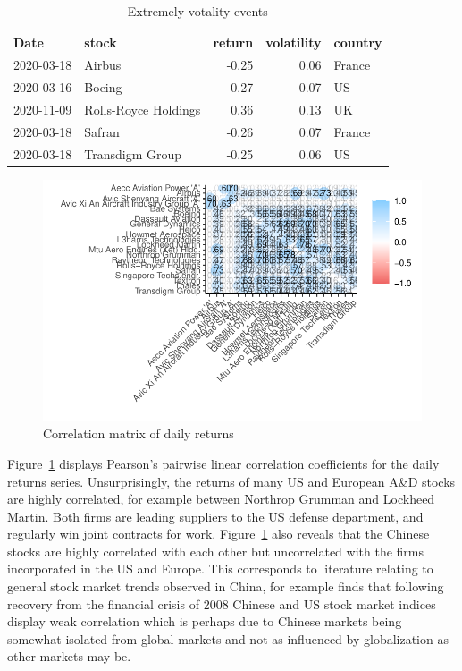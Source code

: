 \documentclass[
  number]{elsarticle}
\begin{document}
\hypertarget{tbl-Xtremes}{}
\begin{table}[H]
\caption{\label{tbl-Xtremes}Extremely votality events }\tabularnewline

\centering
\begin{tabular}[t]{llrrl}
\toprule
Date & stock & return & volatility & country\\
\midrule
2020-03-18 & Airbus & -0.25 & 0.06 & France\\
2020-03-16 & Boeing & -0.27 & 0.07 & US\\
2020-11-09 & Rolls-Royce Holdings & 0.36 & 0.13 & UK\\
2020-03-18 & Safran & -0.26 & 0.07 & France\\
2020-03-18 & Transdigm Group & -0.25 & 0.06 & US\\
\bottomrule
\end{tabular}
\end{table}

\begin{figure}[H]

{\centering \includegraphics{defence_files/figure-pdf/fig-cor-1.pdf}

}

\caption{\label{fig-cor}Correlation matrix of daily returns}

\end{figure}

Figure~\ref{fig-cor} displays Pearson's pairwise linear correlation
coefficients for the daily returns series. Unsurprisingly, the returns
of many US and European A\&D stocks are highly correlated, for example
between Northrop Grumman and Lockheed Martin. Both firms are leading
suppliers to the US defense department, and regularly win joint
contracts for work. Figure~\ref{fig-cor} also reveals that the Chinese
stocks are highly correlated with each other but uncorrelated with the
firms incorporated in the US and Europe. This corresponds to literature
relating to general stock market trends observed in China, for example
\citep{valukonis2014} finds that following recovery from the financial
crisis of 2008 Chinese and US stock market indices display weak
correlation which is perhaps due to Chinese markets being somewhat
isolated from global markets and not as influenced by globalization as
other markets may be.
\end{document}
